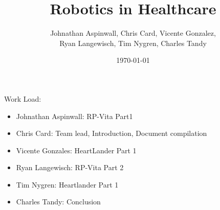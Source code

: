 \documentclass[12pt,conference]{IEEEtran}
\title{Robotics in Healthcare}
\date{\today}
\author{Johnathan Aspinwall, Chris Card, Vicente Gonzalez, \\
Ryan Langewisch, Tim Nygren, Charles Tandy}
\begin{document}
\maketitle
\thispagestyle{plain}
\pagestyle{plain}




\appendix
Work Load:
\begin{itemize}
\item Johnathan Aspinwall: RP-Vita Part1
\item Chris Card: Team lead, Introduction, Document compilation
\item Vicente Gonzales: HeartLander Part 1
\item Ryan Langewisch: RP-Vita Part 2
\item Tim Nygren: Heartlander Part 1
\item Charles Tandy: Conclusion
\end{itemize}
\end{document}
